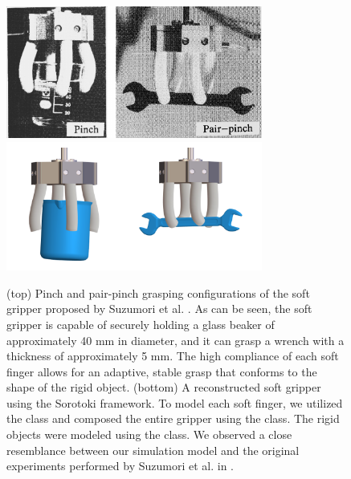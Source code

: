 \begin{figure}[!t]
    \centering
    \includegraphics*[width=0.75\textwidth]{./pdf/thesis-figure-6-26-1.pdf}
    \includegraphics*[width=0.75\textwidth]{./pdf/thesis-figure-6-26-2.pdf}
    \caption{(top) Pinch and pair-pinch grasping configurations of the soft gripper proposed by Suzumori et al. \cite{Suzumori1992, Suzumori1991}. As can be seen, the soft gripper is capable of securely holding a glass beaker of approximately 40 \si{\milli \meter} in diameter, and it can grasp a wrench with a thickness of approximately 5 \si{\milli \meter}. The high compliance of each soft finger allows for an adaptive, stable grasp that conforms to the shape of the rigid object. (bottom) A reconstructed soft gripper using the Sorotoki framework. To model each soft finger, we utilized the  class and composed the entire gripper using the  class. The rigid objects were modeled using the  class. We observed a close resemblance between our simulation model and the original experiments performed by Suzumori et al. in \cite{Suzumori1991, Suzumori1992}.}
    \label{fig:C5:suzumori_gripper_grasp}
    \vspace{-3mm}
\end{figure}


